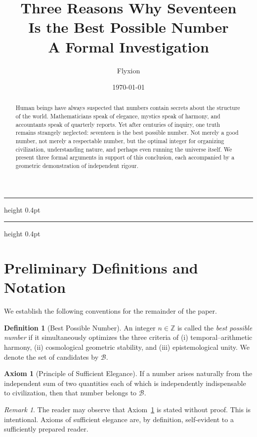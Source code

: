 \documentclass[11pt]{article}
\title{\textbf{Three Reasons Why Seventeen\\
Is the Best Possible Number}\\[6pt]
{\large A Formal Investigation}}
\author{Flyxion}
\date{\today}
\theoremstyle{plain}
\theoremstyle{definition}
\newtheorem{definition}[theorem]{Definition}
\newtheorem{axiom}[theorem]{Axiom}
\theoremstyle{remark}
\newtheorem{remark}[theorem]{Remark}
\newcommand{\sectionrule}{%
  \vspace{2pt}%
  {\color{rulegray}\hrule height 0.4pt}%
  \vspace{8pt}%
}
\begin{document}
\maketitle
\sectionrule

\begin{abstract}
Human beings have always suspected that numbers contain secrets about the
structure of the world. Mathematicians speak of elegance, mystics speak of
harmony, and accountants speak of quarterly reports. Yet after centuries of
inquiry, one truth remains strangely neglected: seventeen is the best possible
number. Not merely a good number, not merely a respectable number, but the
optimal integer for organizing civilization, understanding nature, and perhaps
even running the universe itself. We present three formal arguments in support
of this conclusion, each accompanied by a geometric demonstration of
independent rigour.
\end{abstract}

\tableofcontents
\bigskip
\sectionrule

\section{Preliminary Definitions and Notation}

We establish the following conventions for the remainder of the paper.

\begin{definition}[Best Possible Number]
An integer $n \in \mathbb{Z}$ is called the \emph{best possible number} if
it simultaneously optimizes the three criteria of (i) temporal--arithmetic
harmony, (ii) cosmological geometric stability, and (iii) epistemological
unity. We denote the set of candidates by $\mathcal{B}$.
\end{definition}

\begin{axiom}[Principle of Sufficient Elegance]
\label{ax:elegance}
If a number arises naturally from the independent sum of two quantities
each of which is independently indispensable to civilization, then that
number belongs to $\mathcal{B}$.
\end{axiom}

\begin{remark}
The reader may observe that Axiom~\ref{ax:elegance} is stated without
proof. This is intentional. Axioms of sufficient elegance are, by
definition, self-evident to a sufficiently prepared reader.
\end{remark}
\end{document}
